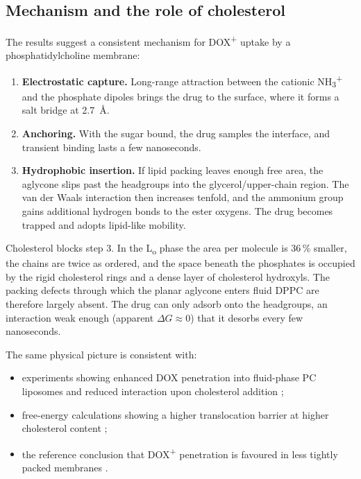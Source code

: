 \documentclass[11pt,a4paper]{article}
\newcommand{\dox}{DOX\textsuperscript{+}}
\newcommand{\nhthree}{NH\textsubscript{3}\textsuperscript{+}}
\newcommand{\Lo}{L\textsubscript{o}}
\begin{document}
\subsection{Mechanism and the role of cholesterol}
The results suggest a consistent mechanism for \dox{} uptake by a phosphatidylcholine membrane:
\begin{enumerate}[label=\arabic*.]
  \item \textbf{Electrostatic capture.} Long-range attraction between the cationic \nhthree{} and the
        phosphate dipoles brings the drug to the surface, where it forms a salt bridge at
        \SI{2.7}{\angstrom}.
  \item \textbf{Anchoring.} With the sugar bound, the drug samples the interface, and transient binding
        lasts a few nanoseconds.
  \item \textbf{Hydrophobic insertion.} If lipid packing leaves enough free area, the aglycone slips
        past the headgroups into the glycerol/upper-chain region. The van der Waals interaction then
        increases tenfold, and the ammonium group gains additional hydrogen bonds to the ester
        oxygens. The drug becomes trapped and adopts lipid-like mobility.
\end{enumerate}

Cholesterol blocks step 3. In the \Lo{} phase the area per molecule is 36\,\% smaller, the chains are
twice as ordered, and the space beneath the phosphates is occupied by the rigid cholesterol rings and a
dense layer of cholesterol hydroxyls. The packing defects through which the planar aglycone enters fluid
DPPC are therefore largely absent. The drug can only adsorb onto the headgroups, an interaction weak
enough (apparent $\Delta G \approx 0$) that it desorbs every few nanoseconds.

The same physical picture is consistent with:
\begin{itemize}
  \item experiments showing enhanced DOX penetration into fluid-phase PC liposomes and reduced
        interaction upon cholesterol addition \cite{siani2021,alves2017};
  \item free-energy calculations showing a higher translocation barrier at higher cholesterol content
        \cite{yacoub2011};
  \item the reference conclusion that \dox{} penetration is favoured in less tightly packed membranes
        \cite{siani2021}.
\end{itemize}
\end{document}
